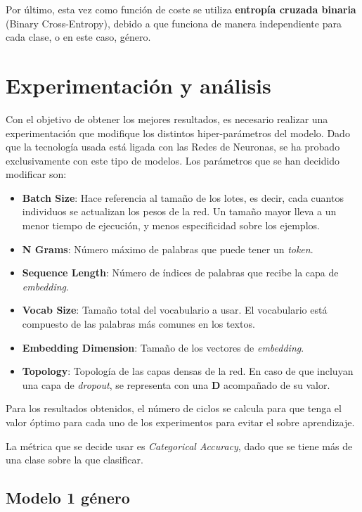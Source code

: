 \documentclass[12pt,a4paper, xcolor=table]{article}
\begin{document}
Por último, esta vez como función de coste se utiliza \textbf{entropía cruzada binaria} (Binary Cross-Entropy), debido a que funciona de manera independiente para cada clase, o en este caso, género.

\section{Experimentación y análisis}

Con el objetivo de obtener los mejores resultados, es necesario realizar una experimentación que modifique los distintos hiper-parámetros del modelo. Dado que la tecnología usada está ligada con las Redes de Neuronas, se ha probado exclusivamente con este tipo de modelos. Los parámetros que se han decidido modificar son:

\begin{itemize}
  \item \textbf{Batch Size}: Hace referencia al tamaño de los lotes, es decir, cada cuantos individuos se actualizan los pesos de la red. Un tamaño mayor lleva a un menor tiempo de ejecución, y menos especificidad sobre los ejemplos.
  \item \textbf{N Grams}: Número máximo de palabras que puede tener un \textit{token}.
  \item \textbf{Sequence Length}: Número de índices de palabras que recibe la capa de \textit{embedding}.
  \item \textbf{Vocab Size}: Tamaño total del vocabulario a usar. El vocabulario está compuesto de las palabras más comunes en los textos.
  \item \textbf{Embedding Dimension}: Tamaño de los vectores de \textit{embedding}.
  \item \textbf{Topology}: Topología de las capas densas de la red. En caso de que incluyan una capa de \textit{dropout}, se representa con una \textbf{D} acompañado de su valor.
\end{itemize}

Para los resultados obtenidos, el número de ciclos se calcula para que tenga el valor óptimo para cada uno de los experimentos para evitar el sobre aprendizaje.

\vspace{2mm}

La métrica que se decide usar es \textit{Categorical Accuracy}, dado que se tiene más de una clase sobre la que clasificar.


\subsection{Modelo 1 género}
\end{document}
